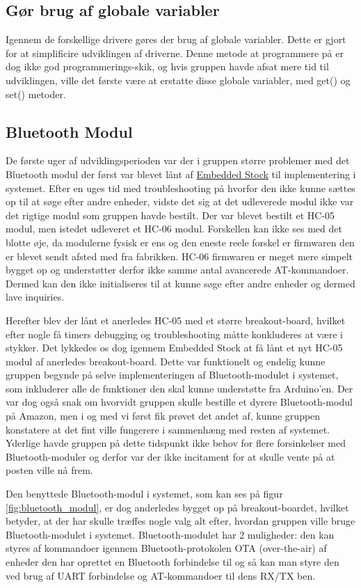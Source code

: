 \subsection{Gør brug af globale variabler}
Igennem de forskellige drivere gøres der brug af globale variabler. Dette er gjort for at simplificire udviklingen af driverne. Denne metode at programmere på er dog ikke god programmerings-skik, og hvis gruppen havde afsat mere tid til udviklingen, ville det første være at erstatte disse globale variabler, med get() og set() metoder. 

\subsection{Bluetooth Modul}
De første uger af udviklingsperioden var der i gruppen større problemer med det Bluetooth modul der først var blevet lånt af \href{https://stockmanager.ase.au.dk/}{Embedded Stock} til implementering i systemet. Efter en uges tid med troubleshooting på hvorfor den ikke kunne sættes op til at søge efter andre enheder, vidste det sig at det udleverede modul ikke var det rigtige modul som gruppen havde bestilt. Der var blevet bestilt et HC-05 modul, men istedet udleveret et HC-06 modul. Forskellen kan ikke ses med det blotte øje, da modulerne fysisk er ens og den eneste reele forskel er firmwaren den er blevet sendt afsted med fra fabrikken. HC-06 firmwaren er meget mere simpelt bygget op og understøtter derfor ikke samme antal avancerede AT-kommandoer. Dermed kan den ikke initialiseres til at kunne søge efter andre enheder og dermed lave inquiries.

Herefter blev der lånt et anerledes HC-05 med et større breakout-board, hvilket efter nogle få timers debugging og troubleshooting måtte konkluderes at være i stykker. Det lykkedes os dog igennem Embedded Stock at få lånt et nyt HC-05 modul af anerledes breakout-board. Dette var funktionelt og endelig kunne gruppen begynde på selve implementeringen af Bluetooth-modulet i systemet, som inkluderer alle de funktioner den skal kunne understøtte fra Arduino'en. Der var dog også snak om hvorvidt gruppen skulle bestille et dyrere Bluetooth-modul på Amazon, men i og med vi først fik prøvet det andet af, kunne gruppen konstatere at det fint ville fungerere i sammenhæng med resten af systemet. Yderlige havde gruppen på dette tidspunkt ikke behov for flere forsinkelser med Bluetooth-moduler og derfor var der ikke incitament for at skulle vente på at posten ville nå frem.

Den benyttede Bluetooth-modul i systemet, som kan ses på figur \ref{fig:bluetooth_modul}, er dog anderledes bygget op på breakout-boardet, hvilket betyder, at der har skulle træffes nogle valg alt efter, hvordan gruppen ville bruge Bluetooth-modulet i systemet. Bluetooth-modulet har 2 muligheder: den kan styres af kommandoer igennem Bluetooth-protokolen OTA (over-the-air) af enheder den har oprettet en Bluetooth forbindelse til og så kan man styre den ved brug af UART forbindelse og AT-kommandoer til dens RX/TX ben.

